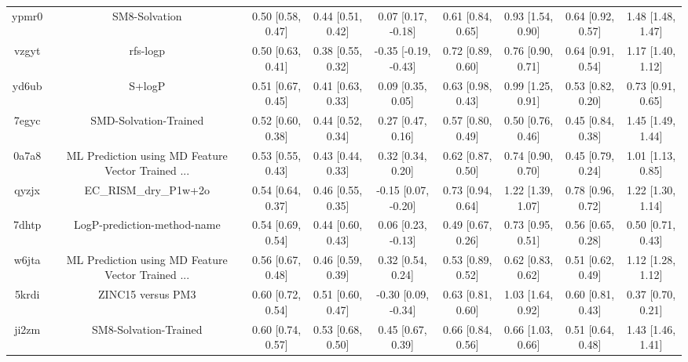 \documentclass{article}
\begin{document}
\begin{center}
\begin{longtable}{|ccccccccc|}
 ypmr0 &                                      SM8-Solvation &  0.50 [0.58, 0.47] &  0.44 [0.51, 0.42] &    0.07 [0.17, -0.18] &  0.61 [0.84, 0.65] &     0.93 [1.54, 0.90] &     0.64 [0.92, 0.57] &     1.48 [1.48, 1.47] \\
 vzgyt &                                           rfs-logp &  0.50 [0.63, 0.41] &  0.38 [0.55, 0.32] &  -0.35 [-0.19, -0.43] &  0.72 [0.89, 0.60] &     0.76 [0.90, 0.71] &     0.64 [0.91, 0.54] &     1.17 [1.40, 1.12] \\
 yd6ub &                                             S+logP &  0.51 [0.67, 0.45] &  0.41 [0.63, 0.33] &     0.09 [0.35, 0.05] &  0.63 [0.98, 0.43] &     0.99 [1.25, 0.91] &     0.53 [0.82, 0.20] &     0.73 [0.91, 0.65] \\
 7egyc &                              SMD-Solvation-Trained &  0.52 [0.60, 0.38] &  0.44 [0.52, 0.34] &     0.27 [0.47, 0.16] &  0.57 [0.80, 0.49] &     0.50 [0.76, 0.46] &     0.45 [0.84, 0.38] &     1.45 [1.49, 1.44] \\
 0a7a8 &  ML Prediction using MD Feature Vector Trained ... &  0.53 [0.55, 0.43] &  0.43 [0.44, 0.33] &     0.32 [0.34, 0.20] &  0.62 [0.87, 0.50] &     0.74 [0.90, 0.70] &     0.45 [0.79, 0.24] &     1.01 [1.13, 0.85] \\
 qyzjx &                              EC\_RISM\_dry\_P1w+2o &  0.54 [0.64, 0.37] &  0.46 [0.55, 0.35] &   -0.15 [0.07, -0.20] &  0.73 [0.94, 0.64] &     1.22 [1.39, 1.07] &     0.78 [0.96, 0.72] &     1.22 [1.30, 1.14] \\
 7dhtp &                        LogP-prediction-method-name &  0.54 [0.69, 0.54] &  0.44 [0.60, 0.43] &    0.06 [0.23, -0.13] &  0.49 [0.67, 0.26] &     0.73 [0.95, 0.51] &     0.56 [0.65, 0.28] &     0.50 [0.71, 0.43] \\
 w6jta &  ML Prediction using MD Feature Vector Trained ... &  0.56 [0.67, 0.48] &  0.46 [0.59, 0.39] &     0.32 [0.54, 0.24] &  0.53 [0.89, 0.52] &     0.62 [0.83, 0.62] &     0.51 [0.62, 0.49] &     1.12 [1.28, 1.12] \\
 5krdi &                                  ZINC15 versus PM3 &  0.60 [0.72, 0.54] &  0.51 [0.60, 0.47] &   -0.30 [0.09, -0.34] &  0.63 [0.81, 0.60] &     1.03 [1.64, 0.92] &     0.60 [0.81, 0.43] &     0.37 [0.70, 0.21] \\
 ji2zm &                              SM8-Solvation-Trained &  0.60 [0.74, 0.57] &  0.53 [0.68, 0.50] &     0.45 [0.67, 0.39] &  0.66 [0.84, 0.56] &     0.66 [1.03, 0.66] &     0.51 [0.64, 0.48] &     1.43 [1.46, 1.41] \\

\end{longtable}
\end{center}
\end{document}
